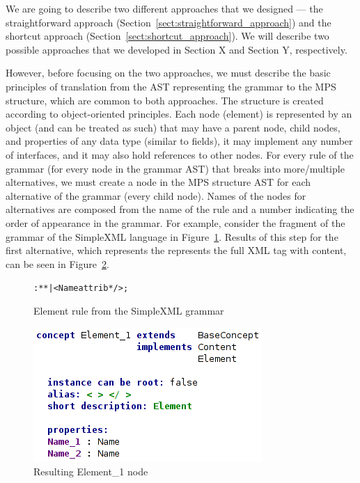 We are going to describe two different approaches that we designed --- the straightforward approach (Section~\ref{sect:straightforward_approach}) and the shortcut approach (Section~\ref{sect:shortcut_approach}).
We will describe two possible approaches that we developed in Section X and Section Y, respectively.

However, before focusing on the two approaches, we must describe the basic principles of translation from the AST representing the grammar to the MPS structure, which are common to both approaches.
The structure is created according to object-oriented principles.
Each node (element) is represented by an object (and can be treated as such) that may have a parent node, child nodes, and properties of any data type (similar to fields), it may implement any number of interfaces, and it may also hold references to other nodes.
For every rule of the grammar (for every node in the grammar AST) that breaks into more/multiple alternatives, we must create a node in the MPS structure AST for each alternative of the grammar (every child node).
Names of the nodes for alternatives are composed from the name of the rule and a number indicating the order of appearance in the grammar.
For example, consider the fragment of the grammar of the SimpleXML language in Figure~\ref{fig:xmlelementrule}.
Results of this step for the first alternative, which represents the represents the full XML tag with content, can be seen in Figure~\ref{fig:element_node_common}.

\begin{figure}[ht]
\centering
\begin{framed}
\begin{alltt}
	 : \antlrliteral{<}  * \antlrliteral{>} * \antlrliteral{</}  \antlrliteral{>} | \antlrap<\antlrap Name attrib* \antlrap/>\antlrap ;
\end{alltt}
\end{framed}
\caption{Element rule from the SimpleXML grammar}
\label{fig:xmlelementrule}
\end{figure}

\begin{figure}[ht]
	\centering
	\includegraphics[scale=0.75]{./images/element_node_common.png}
	\caption{Resulting Element{\_}1 node}
	\label{fig:element_node_common}
\end{figure}

